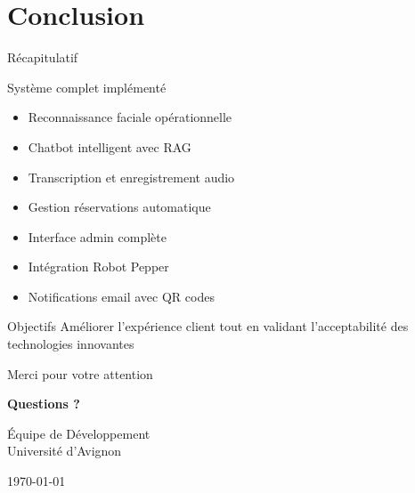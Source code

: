 \documentclass[aspectratio=169,11pt]{beamer}
\begin{document}

\section{Conclusion}

\begin{frame}{Récapitulatif}
\begin{block}{Système complet implémenté}
\begin{itemize}
    \item[\textcolor{successgreen}{\faCheckCircle}] Reconnaissance faciale opérationnelle
    \item[\textcolor{successgreen}{\faCheckCircle}] Chatbot intelligent avec RAG
    \item[\textcolor{successgreen}{\faCheckCircle}] Transcription et enregistrement audio
    \item[\textcolor{successgreen}{\faCheckCircle}] Gestion réservations automatique
    \item[\textcolor{successgreen}{\faCheckCircle}] Interface admin complète
    \item[\textcolor{successgreen}{\faCheckCircle}] Intégration Robot Pepper
    \item[\textcolor{successgreen}{\faCheckCircle}] Notifications email avec QR codes
\end{itemize}
\end{block}

\begin{block}{Objectifs}
Améliorer l'expérience client tout en validant l'acceptabilité des technologies innovantes
\end{block}
\end{frame}

\begin{frame}{Merci pour votre attention}
\begin{center}
\Large
\textbf{Questions ?}

\vspace{2cm}

\large
Équipe de Développement\\
Université d'Avignon

\vspace{1cm}

\today
\end{center}
\end{frame}
\end{document}
